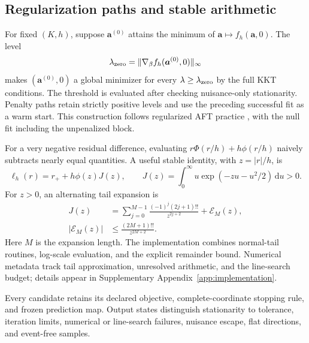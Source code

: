 \subsection{Regularization paths and stable arithmetic}
\label{subsec:comp-paths}
For fixed $(K,h)$, suppose $\bm{a}^{(0)}$ attains the minimum of $\bm{a}\mapsto f_h(\bm{a},0)$. The level
\begin{equation}
 \lambda_{\rm zero}=\|\nabla_\beta f_h(\bm{a}^{(0)},0)\|_\infty
 \label{eq:comp-lambda-zero}
\end{equation}
makes $(\bm{a}^{(0)},0)$ a global minimizer for every $\lambda\ge\lambda_{\rm zero}$ by the full KKT conditions. The threshold is evaluated after checking nuisance-only stationarity. Penalty paths retain strictly positive levels and use the preceding successful fit as a warm start. This construction follows regularized AFT practice \citep{SuderMolstad2022}, with the null fit including the unpenalized block.

For a very negative residual difference, evaluating $r\Phi(r/h)+h\phi(r/h)$ naively subtracts nearly equal quantities. A useful stable identity, with $z=|r|/h$, is
\begin{equation}
 \ell_h(r)=r_++h\phi(z)J(z),\qquad
 J(z)=\int_0^\infty u\exp(-zu-u^2/2)\,\mathrm{d}u>0.
 \label{eq:comp-stable-loss}
\end{equation}
For $z>0$, an alternating tail expansion is
\begin{equation}
 \begin{split}
 J(z)&=\sum_{j=0}^{M-1}\frac{(-1)^j(2j+1)!!}{z^{2j+2}}+\mathcal E_M(z),\\
 |\mathcal E_M(z)|&\le\frac{(2M+1)!!}{z^{2M+2}}.
 \end{split}
 \label{eq:comp-tail-expansion}
\end{equation}
Here $M$ is the expansion length. The implementation combines normal-tail routines, log-scale evaluation, and the explicit remainder bound. Numerical metadata track tail approximation, unresolved arithmetic, and the line-search budget; details appear in Supplementary Appendix~\ref{app:implementation}.

Every candidate retains its declared objective, complete-coordinate stopping rule, and frozen prediction map. Output states distinguish stationarity to tolerance, iteration limits, numerical or line-search failures, nuisance escape, flat directions, and event-free samples.
